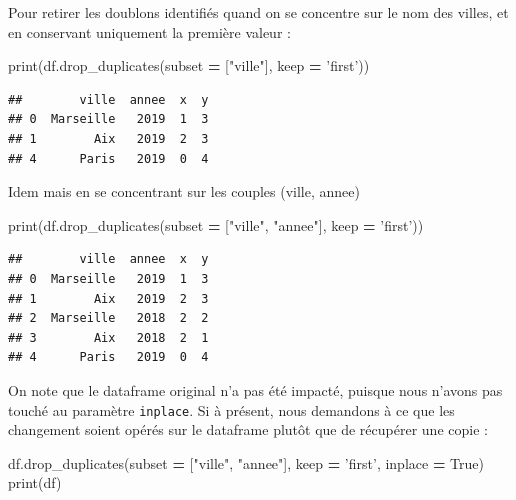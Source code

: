 \documentclass[12pt,]{book}
\newenvironment{Shaded}{\begin{snugshade}}{\end{snugshade}}
\newcommand{\StringTok}[1]{\textcolor[rgb]{0.31,0.60,0.02}{#1}}
\newcommand{\VariableTok}[1]{\textcolor[rgb]{0.00,0.00,0.00}{#1}}
\newcommand{\OperatorTok}[1]{\textcolor[rgb]{0.81,0.36,0.00}{\textbf{#1}}}
\newcommand{\BuiltInTok}[1]{#1}
\newcommand{\NormalTok}[1]{#1}
\numberwithin{equation}{section}
\numberwithin{countremarque}{section}
\begin{document}
Pour retirer les doublons identifiés quand on se concentre sur le nom
des villes, et en conservant uniquement la première valeur :

\begin{Shaded}
\begin{Highlighting}[]
\BuiltInTok{print}\NormalTok{(df.drop_duplicates(subset }\OperatorTok{=}\NormalTok{ [}\StringTok{"ville"}\NormalTok{], keep }\OperatorTok{=} \StringTok{'first'}\NormalTok{))}
\end{Highlighting}
\end{Shaded}

\begin{lstlisting}
##        ville  annee  x  y
## 0  Marseille   2019  1  3
## 1        Aix   2019  2  3
## 4      Paris   2019  0  4
\end{lstlisting}

Idem mais en se concentrant sur les couples (ville, annee)

\begin{Shaded}
\begin{Highlighting}[]
\BuiltInTok{print}\NormalTok{(df.drop_duplicates(subset }\OperatorTok{=}\NormalTok{ [}\StringTok{"ville"}\NormalTok{, }\StringTok{"annee"}\NormalTok{], keep }\OperatorTok{=} \StringTok{'first'}\NormalTok{))}
\end{Highlighting}
\end{Shaded}

\begin{lstlisting}
##        ville  annee  x  y
## 0  Marseille   2019  1  3
## 1        Aix   2019  2  3
## 2  Marseille   2018  2  2
## 3        Aix   2018  2  1
## 4      Paris   2019  0  4
\end{lstlisting}

On note que le dataframe original n'a pas été impacté, puisque nous
n'avons pas touché au paramètre \texttt{inplace}. Si à présent, nous
demandons à ce que les changement soient opérés sur le dataframe plutôt
que de récupérer une copie :

\begin{Shaded}
\begin{Highlighting}[]
\NormalTok{df.drop_duplicates(subset }\OperatorTok{=}\NormalTok{ [}\StringTok{"ville"}\NormalTok{, }\StringTok{"annee"}\NormalTok{], keep }\OperatorTok{=} \StringTok{'first'}\NormalTok{, inplace }\OperatorTok{=} \VariableTok{True}\NormalTok{)}
\BuiltInTok{print}\NormalTok{(df)}
\end{Highlighting}
\end{Shaded}
\end{document}
